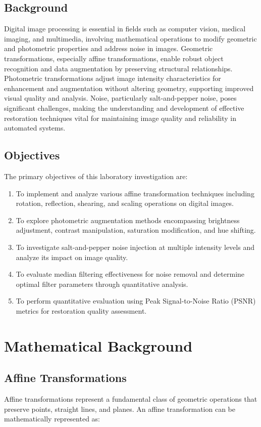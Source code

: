 \documentclass[a4paper, journal]{IEEEtran}
\begin{document}
\subsection{Background}
Digital image processing is essential in fields such as computer vision, medical imaging, and multimedia, involving mathematical operations to modify geometric and photometric properties and address noise in images. Geometric transformations, especially affine transformations, enable robust object recognition and data augmentation by preserving structural relationships. Photometric transformations adjust image intensity characteristics for enhancement and augmentation without altering geometry, supporting improved visual quality and analysis. Noise, particularly salt-and-pepper noise, poses significant challenges, making the understanding and development of effective restoration techniques vital for maintaining image quality and reliability in automated systems.

\subsection{Objectives}
The primary objectives of this laboratory investigation are:

\begin{enumerate}
    \item To implement and analyze various affine transformation techniques including rotation, reflection, shearing, and scaling operations on digital images.
    \item To explore photometric augmentation methods encompassing brightness adjustment, contrast manipulation, saturation modification, and hue shifting.
    \item To investigate salt-and-pepper noise injection at multiple intensity levels and analyze its impact on image quality.
    \item To evaluate median filtering effectiveness for noise removal and determine optimal filter parameters through quantitative analysis.
    \item To perform quantitative evaluation using Peak Signal-to-Noise Ratio (PSNR) metrics for restoration quality assessment.
\end{enumerate}

\section{Mathematical Background}

\subsection{Affine Transformations}
Affine transformations represent a fundamental class of geometric operations that preserve points, straight lines, and planes. An affine transformation can be mathematically represented as:
\end{document}
